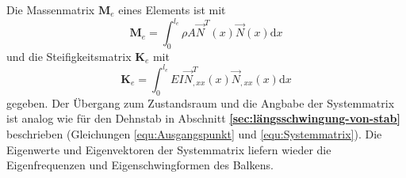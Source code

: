 \documentclass[a4paper,10pt,twoside]{article}
\numberwithin{equation}{section} %
\numberwithin{figure}{section}   %
\numberwithin{table}{section}    %
\begin{document}
	Die Massenmatrix $ \mathbf{M}_{e} $ eines Elements ist mit
	\begin{equation}\label{equ:balken-Me-matrix}
	\mathbf{M}_{e} = \int_{0}^{l_{e}} \rho A \vec{N}^{T}(x) \vec{N}(x) \mathrm{d}x
	\end{equation}
	und die Steifigkeitsmatrix $ \mathbf{K}_{e} $ mit
	\begin{equation}\label{equ:balken-Ke-matrix}
	\mathbf{K}_{e} = \int_{0}^{l_{e}} EI \vec{N}_{,xx}^{T}(x) \vec{N}_{,xx}(x) \mathrm{d}x
	\end{equation}
	gegeben. Der Übergang zum Zustandsraum und die Angbabe der Systemmatrix ist analog wie für den Dehnstab in Abschnitt \textbf{\ref{sec:längsschwingung-von-stab}} beschrieben (Gleichungen \ref{equ:Ausgangspunkt} und \ref{equ:Systemmatrix}). Die Eigenwerte und Eigenvektoren der Systemmatrix liefern wieder die Eigenfrequenzen und Eigenschwingformen des Balkens.

	
\end{document}
